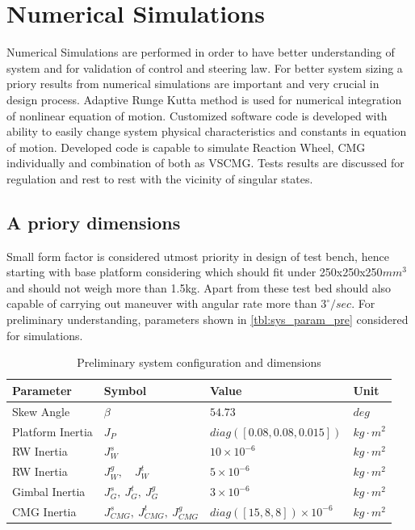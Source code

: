\chapter{Numerical Simulations}
\label{chap:5}
Numerical Simulations are performed in order to have better understanding of system and for validation of control and steering law. For better system sizing a priory results from numerical simulations are important and very crucial in design process. Adaptive Runge Kutta method is used for numerical integration of nonlinear equation of motion. Customized software code is developed with ability to easily change system physical characteristics and constants in equation of motion. Developed code is capable to simulate Reaction Wheel, CMG individually and combination of both as VSCMG. Tests results are discussed for regulation and rest to rest with the vicinity of singular states.

\section{A priory dimensions}
Small form factor is considered utmost priority in design of test bench, hence starting with base platform considering which should fit under 250x250x250$\displaystyle mm^{3}$ and should not weigh more than 1.5kg. Apart from these test bed should also capable of carrying out maneuver with angular rate more than $\displaystyle 3^{\circ } /sec$. For preliminary understanding, parameters shown in \autoref{tbl:sys_param_pre} considered for simulations. 
\begin{table}[!h]
        \centering
        
\begin{tabular}{p{}|p{}|p{}|p{}}
\toprule
 Parameter & Symbol & Value & Unit \\
\midrule
 Skew Angle & $\displaystyle \beta $ & $\displaystyle 54.73$ & $\displaystyle deg$ \\

 Platform Inertia & $\displaystyle J_{P}$ & $\displaystyle diag([ 0.08,0.08,0.015])$ & $\displaystyle kg\cdotp m^{2}$ \\

 RW Inertia & $\displaystyle J^{s}_{W}$ & $\displaystyle 10\times 10^{-6}$ & $\displaystyle kg\cdotp m^{2}$ \\

 RW Inertia & $\displaystyle J^{g}_{W} ,\quad J^{t}_{W}$ & $\displaystyle 5\times 10^{-6}$ & $\displaystyle kg\cdotp m^{2}$ \\

 Gimbal Inertia & $\displaystyle J^{s}_{G} ,\ J^{t}_{G} ,\ J^{g}_{G}$ & $\displaystyle 3\times 10^{-6}$ & $\displaystyle kg\cdotp m^{2}$ \\

 CMG Inertia & $\displaystyle J^{s}_{CMG} ,\ J^{t}_{CMG} ,\ J^{g}_{CMG}$ & $\displaystyle diag([ 15,8,8]) \times 10^{-6}$ & $\displaystyle kg\cdotp m^{2}$ \\
\bottomrule
\end{tabular}
        \caption{Preliminary system configuration and dimensions}
        \label{tbl:sys_param_pre}
        \end{table}


